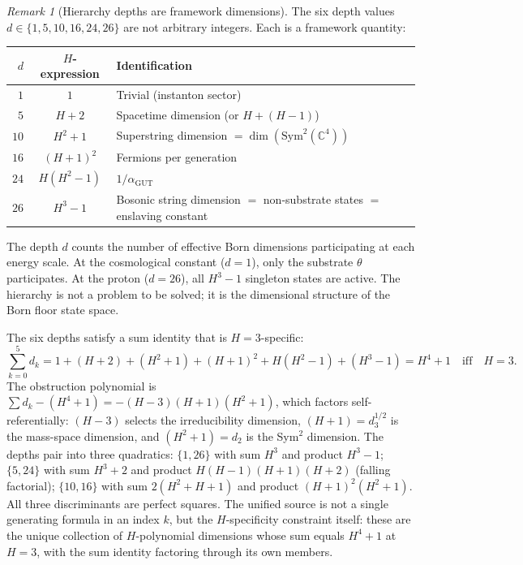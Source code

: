 \documentclass[11pt,a4paper]{article}
\let\hline\midrule
\theoremstyle{definition}
\theoremstyle{remark}
\newtheorem{remark}[theorem]{Remark}
\newcommand{\C}{\mathbb{C}}
\newcommand{\Sym}{\mathrm{Sym}}
\begin{document}
\begin{remark}[Hierarchy depths are framework dimensions]\label{rem:hierarchy_depths}
The six depth values $d\in\{1,5,10,16,24,26\}$ are not arbitrary integers. Each is a framework quantity:
\begin{center}
\begin{tabular}{rcl}
\hline
$d$ & $H$-expression & Identification \\
\hline
$1$ & $1$ & Trivial (instanton sector) \\
$5$ & $H+2$ & Spacetime dimension (or $H+(H-1)$) \\
$10$ & $H^2+1$ & Superstring dimension $=\dim(\Sym^2(\C^4))$ \\
$16$ & $(H+1)^2$ & Fermions per generation \\
$24$ & $H(H^2-1)$ & $1/\alpha_{\mathrm{GUT}}$ \\
$26$ & $H^3-1$ & Bosonic string dimension $=$ non-substrate states $=$ enslaving constant \\
\hline
\end{tabular}
\end{center}
The depth $d$ counts the number of effective Born dimensions participating at each energy scale. At the cosmological constant ($d=1$), only the substrate $\theta$ participates. At the proton ($d=26$), all $H^3-1$ singleton states are active. The hierarchy is not a problem to be solved; it is the dimensional structure of the Born floor state space.

The six depths satisfy a sum identity that is $H=3$-specific:
\begin{equation}\label{eq:hierarchy_sum}
\sum_{k=0}^5 d_k = 1+(H+2)+(H^2+1)+(H+1)^2+H(H^2-1)+(H^3-1) = H^4+1 \quad\text{iff}\quad H=3.
\end{equation}
The obstruction polynomial is $\sum d_k-(H^4+1)=-(H-3)(H+1)(H^2+1)$, which factors self-referentially: $(H-3)$ selects the irreducibility dimension, $(H+1)=d_3^{1/2}$ is the mass-space dimension, and $(H^2+1)=d_2$ is the Sym$^2$ dimension. The depths pair into three quadratics: $\{1,26\}$ with sum $H^3$ and product $H^3-1$; $\{5,24\}$ with sum $H^3+2$ and product $H(H-1)(H+1)(H+2)$ (falling factorial); $\{10,16\}$ with sum $2(H^2+H+1)$ and product $(H+1)^2(H^2+1)$. All three discriminants are perfect squares. The unified source is not a single generating formula in an index $k$, but the $H$-specificity constraint itself: these are the unique collection of $H$-polynomial dimensions whose sum equals $H^4+1$ at $H=3$, with the sum identity factoring through its own members.
\end{remark}
\end{document}
